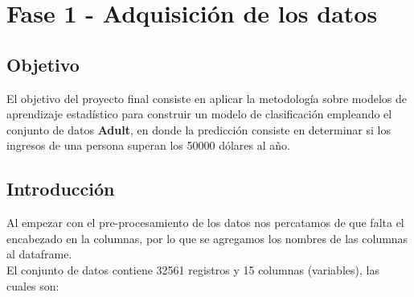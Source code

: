 \documentclass{article}
\begin{document}
	\section{Fase 1 - Adquisición de los datos}
	\subsection{Objetivo}
	
	El objetivo del proyecto final consiste en aplicar la metodología sobre modelos de aprendizaje estadístico para construir un modelo de clasificación empleando el conjunto de datos \textbf{Adult}, en donde la predicción consiste en determinar si los ingresos de una persona superan los 50000 dólares al año.
	
	\subsection{Introducción}
	
	Al empezar con el pre-procesamiento de los datos nos percatamos de que falta el encabezado en la columnas, por lo que se agregamos los nombres de las columnas al dataframe. \\
	
	
	El conjunto de datos contiene 32561 registros y 15 columnas (variables), las cuales son:
	
\end{document}
